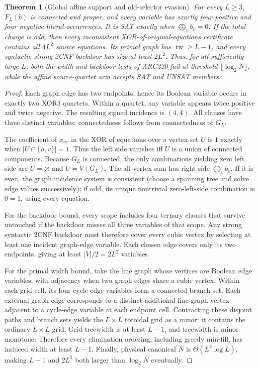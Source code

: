 \documentclass[11pt]{article}
\newtheorem{theorem}{Theorem}
\newcommand{\tw}{\operatorname{tw}}
\begin{document}
\begin{theorem}[Global affine support and old-selector evasion]
For every $L\ge3$, $F_L(b)$ is connected and proper, and every variable
has exactly four positive and four negative literal occurrences.  It is
SAT exactly when $\bigoplus_v b_v=0$.  If the total charge is odd, then
\emph{every} inconsistent XOR-of-original-equations certificate contains
\emph{all} $4L^2$ source equations.  Its primal graph has
$\tw\ge L-1$, and every syntactic strong 2CNF backdoor has size at least
$2L^2$.  Thus, for all sufficiently large $L$, both the width and
backdoor tests of ARC220 fail at threshold $\lfloor\log_2 N\rfloor$,
while the affine source-quartet arm accepts SAT and UNSAT members.
\end{theorem}
\begin{proof}
Each graph edge has two endpoints, hence its Boolean variable occurs in
exactly two XOR3 quartets.  Within a quartet, any variable appears twice
positive and twice negative.  The resulting signed incidence is $(4,4)$.
All clauses have three distinct variables; connectedness follows from
connectedness of $G_L$.

The coefficient of $x_{uv}$ in the XOR of equations over a vertex set $U$
is $1$ exactly when $|U\cap\{u,v\}|=1$.  Thus the left side vanishes
iff $U$ is a union of connected components.  Because $G_L$ is connected,
the only combinations yielding zero left side are $U=\varnothing$ and
$U=V(G_L)$.  The all-vertex sum has right side $\bigoplus_v b_v$.
If it is even, the graph incidence system is consistent (choose a spanning
tree and solve edge values successively); if odd, its unique nontrivial
zero-left-side combination is $0=1$, using every equation.

For the backdoor bound, every scope includes four ternary clauses that
survive untouched if the backdoor misses all three variables of that scope.
Any strong syntactic 2CNF backdoor must therefore cover every cubic vertex
by selecting at least one incident graph-edge variable.  Each chosen edge
covers only its two endpoints, giving at least $|V|/2=2L^2$ variables.

For the primal width bound, take the line graph whose vertices are Boolean
edge variables, with adjacency when two graph edges share a cubic vertex.
Within each grid cell, its four cycle-edge variables form a connected
branch set.  Each external graph edge corresponds to a distinct additional
line-graph vertex adjacent to a cycle-edge variable at each endpoint cell.
Contracting these disjoint paths and branch sets yields the $L\times L$
toroidal grid as a minor; it contains the ordinary $L\times L$ grid.
Grid treewidth is at least $L-1$, and treewidth is minor-monotone.
Therefore every elimination ordering, including greedy min-fill, has
induced width at least $L-1$.  Finally, physical canonical $N$ is
$\Theta(L^2\log L)$, making $L-1$ and $2L^2$ both larger than
$\log_2 N$ eventually.
\end{proof}
\end{document}

